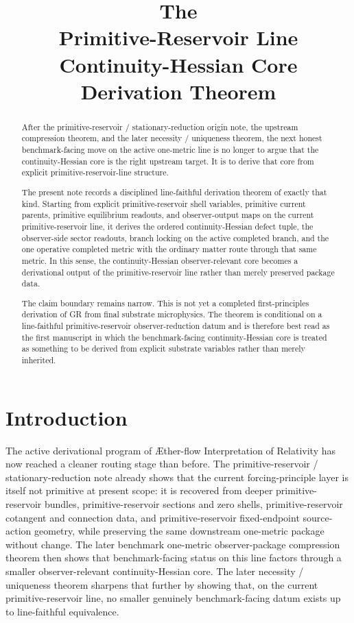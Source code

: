 \documentclass[11pt]{article}
\title{\textbf{The \TheoryName{}}\\[0.4em]
\large Primitive-Reservoir Line Continuity-Hessian Core\\
\large Derivation Theorem}
\author{}
\date{}
\newcommand{\Aflow}{\AE{}ther-flow}
\newcommand{\TheoryName}{\Aflow{} Interpretation of Relativity}
\begin{document}
\maketitle

\begin{abstract}
After the primitive-reservoir / stationary-reduction origin note, the upstream compression theorem, and the later necessity / uniqueness theorem, the next honest benchmark-facing move on the active one-metric line is no longer to argue that the continuity-Hessian core is the right upstream target. It is to derive that core from explicit primitive-reservoir-line structure.

The present note records a disciplined line-faithful derivation theorem of exactly that kind. Starting from explicit primitive-reservoir shell variables, primitive current parents, primitive equilibrium readouts, and observer-output maps on the current primitive-reservoir line, it derives the ordered continuity-Hessian defect tuple, the observer-side sector readouts, branch locking on the active completed branch, and the one operative completed metric with the ordinary matter route through that same metric. In this sense, the continuity-Hessian observer-relevant core becomes a derivational output of the primitive-reservoir line rather than merely preserved package data.

The claim boundary remains narrow. This is not yet a completed first-principles derivation of GR from final substrate microphysics. The theorem is conditional on a line-faithful primitive-reservoir observer-reduction datum and is therefore best read as the first manuscript in which the benchmark-facing continuity-Hessian core is treated as something to be derived from explicit substrate variables rather than merely inherited.
\end{abstract}

\section{Introduction}

The active derivational program of \TheoryName{} has now reached a cleaner routing stage than before. The primitive-reservoir / stationary-reduction note already shows that the current forcing-principle layer is itself not primitive at present scope: it is recovered from deeper primitive-reservoir bundles, primitive-reservoir sections and zero shells, primitive-reservoir cotangent and connection data, and primitive-reservoir fixed-endpoint source-action geometry, while preserving the same downstream one-metric package without change. The later benchmark one-metric observer-package compression theorem then shows that benchmark-facing status on this line factors through a smaller observer-relevant continuity-Hessian core. The later necessity / uniqueness theorem sharpens that further by showing that, on the current primitive-reservoir line, no smaller genuinely benchmark-facing datum exists up to line-faithful equivalence.
\end{document}
